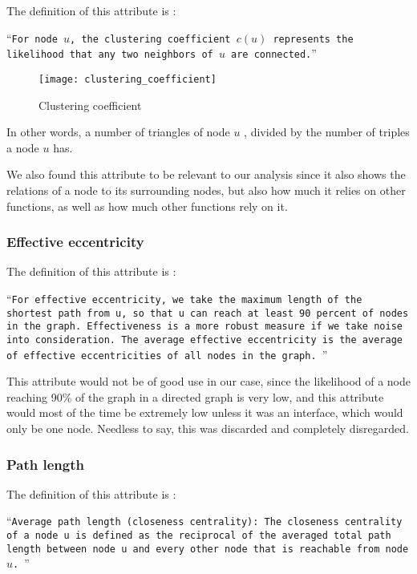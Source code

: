 The definition of this attribute is :

\enquote{\texttt{For node $u$, the clustering coefficient $c(u)$ represents the likelihood that any two neighbors of $u$ are connected.}}\parencite{graphClassification}

\begin{figure}[!htb]
	\caption{Clustering coefficient}
	\centering
	\texttt{[image: clustering\_coefficient]}
\end{figure}

In other words, a number of triangles of node $u$ , divided by the number of triples a node $u$ has.

We also found this attribute to be relevant to our analysis since it also shows the relations of a node to its surrounding nodes, but also how much it relies on other functions, as well as how much other functions rely on it.

\subsubsection{Effective eccentricity}

The definition of this attribute is :

\enquote{\texttt{For effective eccentricity, we take the
		maximum length of the shortest path from u, so that
		u can reach at least 90 percent of nodes in the graph.
		Effectiveness is a more robust measure if we take noise into consideration. The average effective eccentricity is the average of effective eccentricities of all nodes in the graph.
}}\parencite{graphClassification}

This attribute would not be of good use in our case, since the likelihood of a node reaching 90\% of the graph in a directed graph is very low, and this attribute would most of the time be extremely low unless it was an interface, which would only be one node. Needless to say, this was discarded and completely disregarded.

\subsubsection{Path length}

The definition of this attribute is :

\enquote{\texttt{Average path length (closeness centrality): The
		closeness centrality of a node u is defined as the reciprocal of the averaged total path length between node u and every other node that is reachable from node $u$.        
}}\parencite{graphClassification}

